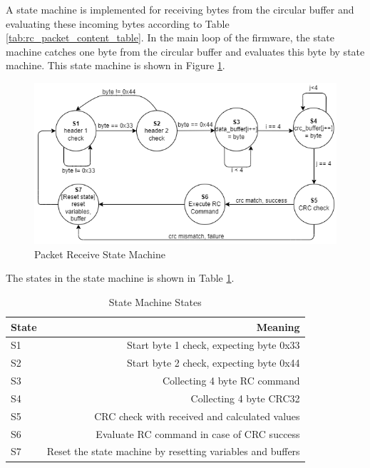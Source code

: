 A state machine is implemented for receiving bytes from the circular buffer and evaluating these incoming bytes according to Table \ref{tab:rc_packet_content_table}. In the main loop of the firmware, the state machine catches one byte from the circular buffer and evaluates this byte by state machine. This state machine is shown in Figure \ref{fig:rc_packet_fsm}. \\

\begin{figure}[!htbp]
    \centering
    \includegraphics[width=1\textwidth]{Imgs/fsm_uart.drawio.png}
    \caption{\label{fig:rc_packet_fsm}Packet Receive State Machine}
\end{figure}

The states in the state machine is shown in Table \ref{tab:rc_fsm_states}. \\

\begin{table}[!htbp]
    \centering
    \caption{\label{tab:rc_fsm_states}State Machine States}
    \begin{tabular}{l|r}
        State & Meaning \\\hline
        S1 & Start byte 1 check, expecting byte 0x33 \\
        S2 & Start byte 2 check, expecting byte 0x44 \\
        S3 & Collecting 4 byte RC command \\
        S4 & Collecting 4 byte CRC32 \\
        S5 & CRC check with received and calculated values \\
        S6 & Evaluate RC command in case of CRC success \\
        S7 & Reset the state machine by resetting variables and buffers \\
    \end{tabular}
\end{table}

